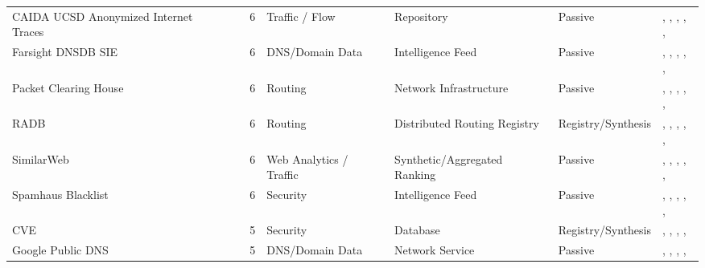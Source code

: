 \begin{table}[h!]
\begin{tabular}{lllllll}
CAIDA UCSD Anonymized Internet Traces & \cite{caidaait} & 6 & Traffic / Flow & Repository & Passive & \cite{10.1145/3730567.3764459}, \cite{10.1145/3730567.3764487}, \cite{10.1145/3646547.3689011}, \cite{10.1145/3646547.3689016}, \cite{10.1145/3487552.3487856}, \cite{10.1007/978-3-030-72582-2_32} \\
Farsight DNSDB SIE & \cite{dnsdb} & 6 & DNS/Domain Data & Intelligence Feed & Passive & \cite{10.1145/3618257.3624805}, \cite{10.1007/978-3-030-98785-5_2}, \cite{10.1145/3517745.3561431}, \cite{10.1007/978-3-031-28486-1_10}, \cite{10.1007/978-3-031-28486-1_22}, \cite{10.1145/3777912.3809146} \\
Packet Clearing House & \cite{pch-data} & 6 & Routing & Network Infrastructure & Passive & \cite{10.1145/3517745.3561443}, \cite{10.1145/3487552.3487865}, \cite{10.1007/978-3-030-98785-5_10}, \cite{10.1007/978-3-030-98785-5_16}, \cite{10.1007/978-3-031-56252-5_5}, \cite{10.1145/3777912.3839829} \\
RADB & \cite{radb} & 6 & Routing & Distributed Routing Registry & Registry/Synthesis & \cite{10.1145/3618257.3624812}, \cite{10.1145/3517745.3561454}, \cite{10.1007/978-3-030-72582-2_14}, \cite{10.1007/978-3-030-98785-5_10}, \cite{10.1007/978-3-030-98785-5_14}, \cite{10.1007/978-3-032-18268-5_2} \\
SimilarWeb & \cite{similarweb} & 6 & Web Analytics / Traffic & Synthetic/Aggregated Ranking & Passive & \cite{10.1145/3646547.3688427}, \cite{10.1145/3517745.3561416}, \cite{10.1007/978-3-030-72582-2_33}, \cite{10.1007/978-3-030-98785-5_19}, \cite{10.1007/978-3-031-28486-1_1}, \cite{10.1145/3777912.3839787} \\
Spamhaus Blacklist & \cite{spamhaus_blocklist} & 6 & Security & Intelligence Feed & Passive & \cite{10.1145/3646547.3689010}, \cite{10.1145/3517745.3561454}, \cite{10.1145/3487552.3487838}, \cite{10.1007/978-3-030-98785-5_2}, \cite{10.1007/978-3-031-56249-5_9}, \cite{10.1145/3777912.3839787} \\
CVE & \cite{cve_mitre} & 5 & Security & Database & Registry/Synthesis & \cite{10.1145/3618257.3624804}, \cite{10.1145/3618257.3624810}, \cite{10.1145/3487552.3487833}, \cite{10.1007/978-3-030-72582-2_5}, \cite{10.1007/978-3-032-18268-5_16} \\
Google Public DNS & \cite{google-public-dns} & 5 & DNS/Domain Data & Network Service & Passive & \cite{10.1145/3487552.3487844}, \cite{10.1007/978-3-031-28486-1_24}, \cite{10.1007/978-3-031-85960-1_3}, \cite{10.1145/3777912.3839811}, \cite{10.1145/3777912.3839830} \\

\end{tabular}
\end{table}
